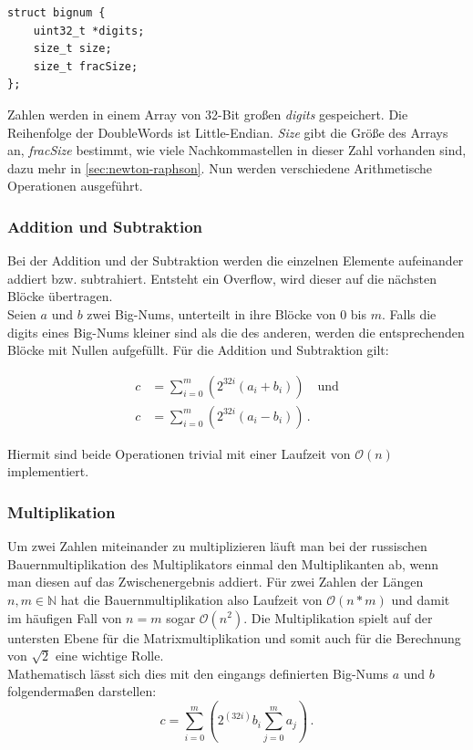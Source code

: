 \documentclass[course=erap]{aspdoc}
\begin{document}
\begin{lstlisting}
struct bignum {
    uint32_t *digits;
    size_t size;
    size_t fracSize;
};
\end{lstlisting}

Zahlen werden in einem Array von 32-Bit großen \textit{digits} gespeichert. Die Reihenfolge der DoubleWords ist Little-Endian. \textit{Size} gibt die Größe des Arrays an, \textit{fracSize} bestimmt, 
wie viele Nachkommastellen in dieser Zahl vorhanden sind, dazu mehr in \ref{sec:newton-raphson}. Nun werden verschiedene Arithmetische Operationen ausgeführt.

\subsubsection*{Addition und Subtraktion}
Bei der Addition und der Subtraktion werden die einzelnen Elemente aufeinander addiert bzw. subtrahiert. Entsteht ein Overflow, wird dieser auf die nächsten Blöcke übertragen. \\
Seien $a$ und $b$ zwei Big-Nums, unterteilt in ihre Blöcke von $0$ bis $m$. Falls die digits eines Big-Nums kleiner sind als die des anderen, werden die entsprechenden Blöcke mit Nullen aufgefüllt. 
Für die Addition und Subtraktion gilt:

\begin{align}
  c &= \sum_{i=0}^m (2^{32i} (a_i + b_i)) \quad  \text{und} \label{eq:bignum_addition} \\ 
  c &= \sum_{i=0}^m (2^{32i} (a_i - b_i)) \, .          \label{eq:bignum_subtraktion}
\end{align}

Hiermit sind beide Operationen trivial mit einer Laufzeit von $\mathcal{O}(n)$ implementiert.

\subsubsection*{Multiplikation}
Um zwei Zahlen miteinander zu multiplizieren läuft man bei der russischen Bauernmultiplikation des Multiplikators einmal den Multiplikanten ab, wenn man diesen auf das Zwischenergebnis addiert. 
Für zwei Zahlen der Längen $n, m \in\mathbb{N}$ hat die Bauernmultiplikation also Laufzeit von $\mathcal{O}(n*m)$ und damit im häufigen Fall von $n=m$ sogar $\mathcal{O}(n^2)$.
Die Multiplikation spielt auf der untersten Ebene für die Matrixmultiplikation und somit auch für die Berechnung von $\sqrt{2}$ eine wichtige Rolle.\\
Mathematisch lässt sich dies mit den eingangs definierten Big-Nums $a$ und $b$ folgendermaßen darstellen:
\begin{equation}
  c = \sum_{i=0}^m (2^{(32i)} b_i \sum_{j=0}^m a_j) \, .
\end{equation}
\end{document}
